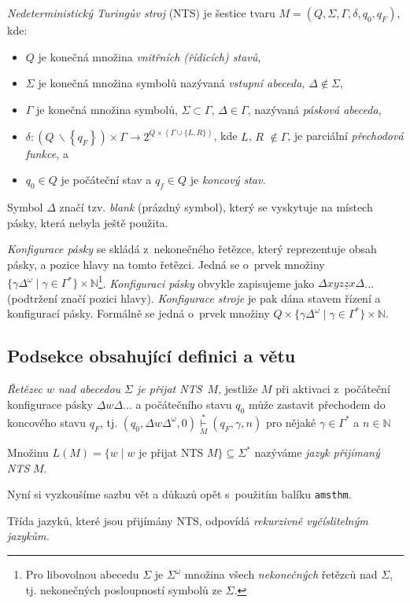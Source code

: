 \documentclass[a4paper, twocolumn, 11pt]{article}
\begin{document}
\begin{definice}
\emph{Nedeterministický Turingův stroj} (NTS) je šestice tvaru $M = (Q,\Sigma,\Gamma,\delta,q_0,q_F)$, kde:
	
	\begin{itemize}
	    \item $Q$ je konečná množina \emph{vnitřních (řídicích) stavů,}
	    \item $\Sigma$ je konečná množina symbolů nazývaná \emph{vstupní abeceda,} $\Delta \notin \Sigma$,
	    \item $\Gamma$ je konečná množina symbolů, $\Sigma \subset \Gamma$, $\Delta \in \Gamma$, nazývaná \emph{pásková abeceda,}
	    \item $\delta:\left(Q\:\backslash \left\{q_{F}\right\}\right) \times \Gamma \rightarrow 2^{Q \times(\Gamma \cup\{L,R\})}$, kde $L$, $R$ $\notin \Gamma$, je parciální \emph{přechodová funkce,} a
	    \item $q_0 \in Q$ je počáteční stav a $q_f \in Q$ je \emph{koncový stav.}
	\end{itemize}
\end{definice}

Symbol $\Delta$ značí tzv. \textit{blank} (prázdný symbol), který se vyskytuje na místech pásky, která nebyla ještě použita.

\textit{Konfigurace pásky} se skládá z~nekonečného řetězce, který reprezentuje obsah pásky, a pozice hlavy na tomto řetězci. Jedná se o~prvek množiny $\{\gamma \Delta^{\omega} \mid \gamma \in \Gamma^{*}\} \times \mathbb{N}$\footnote{Pro libovolnou abecedu $\Sigma$ je $\Sigma^{\omega}$ množina všech \textit{nekonečných} řetězců nad $\Sigma$, tj. nekonečných posloupností symbolů ze $\Sigma$.}.
\textit{Konfiguraci pásky} obvykle zapisujeme jako $\Delta x y z \underline{z} x \Delta$... (podtržení značí pozici hlavy).
\textit{Konfigurace stroje} je pak dána stavem řízení a konfigurací pásky. Formálně se jedná o~prvek množiny $Q \times \{\gamma \Delta^{\omega} \mid \gamma \in \Gamma^{*}\} \times \mathbb{N}$.

\subsection{Podsekce obsahující definici a větu}
\begin{definice}\label{def2}
\emph{Řetězec $w$ nad abecedou $\Sigma$ je přijat NTS}~$M$, jestliže $M$ při aktivaci z~počáteční konfigurace pásky $\underline{\Delta} w \Delta ...$ a počátečního stavu $q_0$ může zastavit přechodem do koncového stavu $q_F$, tj. $\left(q_{0}, \Delta w \Delta^{\omega}, 0\right) \overset{*}{\underset{M}\vdash} \left(q_{F}, \gamma, n\right)$ pro nějaké $\gamma \in \Gamma^{*}$ a $n \in \mathbb{N}$

Množinu $L\left( M \right) = \{w \mid w$ je přijat NTS $M\} \subseteq \Sigma^*$ nazýváme \emph{jazyk přijímaný NTS} $M$.
\end{definice}
Nyní si vyzkoušíme sazbu vět a důkazů opět s~použitím balíku \texttt{amsthm}.
\begin{veta}
Třída jazyků, které jsou přijímány NTS, odpovídá \emph{rekurzivně vyčíslitelným jazykům.}
\end{veta}
\end{document}
